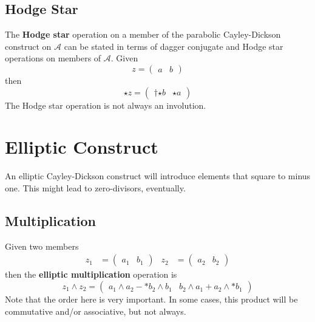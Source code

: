 \subsection{Hodge Star}
The \textbf{Hodge star} operation on a member of the parabolic Cayley-Dickson construct on $\mathcal{A}$ can be stated in terms of dagger conjugate and Hodge star operations on members of $\mathcal{A}$. Given
\begin{equation}
    z = \begin{pmatrix}
        a & b
    \end{pmatrix}
\end{equation}
then
\begin{equation}
     {\star z} = \begin{pmatrix}
         {\dagger {\star b}} &  {\star a}
    \end{pmatrix}
\end{equation}
The Hodge star operation is not always an involution.
\section{Elliptic Construct}
An elliptic Cayley-Dickson construct will introduce elements that square to minus one. This might lead to zero-divisors, eventually.
\subsection{Multiplication}
Given two members
\begin{align*}
    z_{1} &= \begin{pmatrix}
        a_{1} & b_{1}
    \end{pmatrix} &
    z_{2} &= \begin{pmatrix}
        a_{2} & b_{2}
    \end{pmatrix}
\end{align*}
then the \textbf{elliptic multiplication} operation is
\begin{equation}
    z_{1} \wedge z_{2} = \begin{pmatrix}
        a_{1} \wedge a_{2} - {\ast b_{2}} \wedge b_{1} & b_{2} \wedge a_{1} + a_{2} \wedge {\ast b_{1}}
    \end{pmatrix}
\end{equation}
Note that the order here is very important. In some cases, this product will be commutative and/or associative, but not always.
